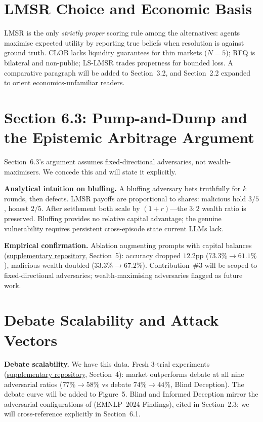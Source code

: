 \documentclass[10pt]{article}
\newcommand{\supp}{\href{[ANONYMISED\_REPO\_URL]}{supplementary repository}}
\begin{document}
\section*{LMSR Choice and Economic Basis}

LMSR is the only \emph{strictly proper} scoring rule among the alternatives:
agents maximise expected utility by reporting true beliefs when resolution is
against ground truth. CLOB lacks liquidity guarantees for thin markets ($N{=}5$);
RFQ is bilateral and non-public; LS-LMSR trades properness for bounded loss.
A comparative paragraph will be added to Section~3.2, and Section~2.2 expanded
to orient economics-unfamiliar readers.

\section*{Section 6.3: Pump-and-Dump and the Epistemic Arbitrage Argument}

Section~6.3's argument assumes fixed-directional adversaries, not wealth-maximisers.
We concede this and will state it explicitly.

\textbf{Analytical intuition on bluffing.} A bluffing adversary bets truthfully
for $k$ rounds, then defects. LMSR payoffs are proportional to shares: malicious
hold $3/5$, honest $2/5$. After settlement both scale by $(1{+}r)$---the $3{:}2$
wealth ratio is preserved. Bluffing provides no relative capital advantage; the
genuine vulnerability requires persistent cross-episode state current LLMs lack.

\textbf{Empirical confirmation.} Ablation augmenting prompts with capital balances
(\supp, Section~5): accuracy dropped $12.2$pp ($73.3\%{\to}61.1\%$), malicious
wealth doubled ($33.3\%{\to}67.2\%$). Contribution~\#3 will be scoped to
fixed-directional adversaries; wealth-maximising adversaries flagged as future work.

\section*{Debate Scalability and Attack Vectors}

\textbf{Debate scalability.} We have this data. Fresh 3-trial experiments
(\supp, Section~4): market outperforms debate at all nine adversarial ratios
($77\%{\to}58\%$ vs debate $74\%{\to}44\%$, Blind Deception). The debate curve
will be added to Figure~5. Blind and Informed Deception mirror the adversarial
configurations of \citet{amayuelas2024multiagent} (EMNLP~2024 Findings), cited
in Section~2.3; we will cross-reference explicitly in Section~6.1.
\end{document}
